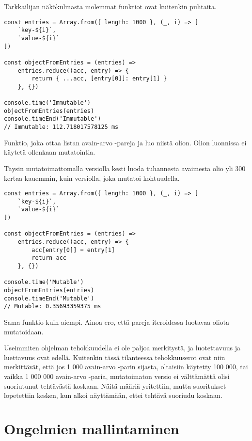 Tarkkailijan näkökulmasta molemmat funktiot ovat kuitenkin puhtaita.

\begin{code}
    \begin{verbatim}
const entries = Array.from({ length: 1000 }, (_, i) => [
    `key-${i}`,
    `value-${i}`
])

const objectFromEntries = (entries) =>
    entries.reduce((acc, entry) => {
        return { ...acc, [entry[0]]: entry[1] }
    }, {})

console.time('Immutable')
objectFromEntries(entries)
console.timeEnd('Immutable')
// Immutable: 112.718017578125 ms
\end{verbatim}
    \caption{Funktio, joka ottaa listan avain-arvo -pareja ja luo niistä olion. Olion luonnissa ei käytetä ollenkaan mutatointia.}
    \label{code:js_just_mutate_immutable}
\end{code}

Täysin mutatoimattomalla versiolla kesti luoda tuhannesta avaimesta olio yli 300 kertaa kauemmin, kuin versiolla, joka mutatoi kohtuudella.


\begin{code}
    \begin{verbatim}
const entries = Array.from({ length: 1000 }, (_, i) => [
    `key-${i}`,
    `value-${i}`
])

const objectFromEntries = (entries) =>
    entries.reduce((acc, entry) => {
        acc[entry[0]] = entry[1]
        return acc
    }, {})
          
console.time('Mutable')
objectFromEntries(entries)
console.timeEnd('Mutable')
// Mutable: 0.35693359375 ms
\end{verbatim}
    \caption{Sama funktio kuin aiempi. Ainoa ero, että pareja iteroidessa luotavaa oliota mutatoidaan.}
    \label{code:js_just_mutate_mutable}
\end{code}

Useimmiten ohjelman tehokkuudella ei ole paljoa merkitystä, ja luotettavuus ja luettavuus ovat edellä. Kuitenkin tässä tilanteessa tehokkuuserot ovat niin merkittävät, että jos 1 000 avain-arvo -parin sijasta, oltaisiin käytetty 100 000, tai vaikka 1 000 000 avain-arvo -paria, mutatoimaton versio ei välttämättä olisi suoriutunut tehtävästä koskaan. Näitä määriä yritettiin, mutta suoritukset lopetettiin kesken, kun alkoi näyttämään, ettei tehtävä suoriudu koskaan.

\section{Ongelmien mallintaminen}

